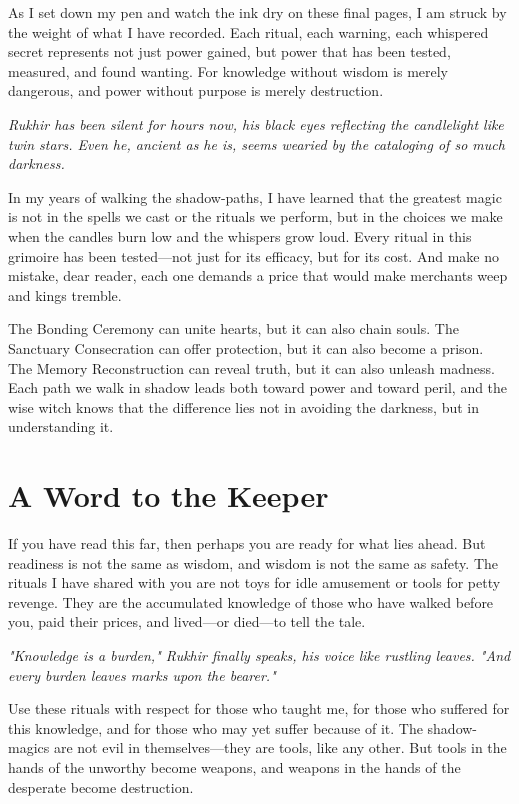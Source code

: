 \documentclass[12pt,twoside]{book}
\newcommand{\shadow}[1]{\textit{#1}}
\begin{document}
\lettrine[lines=3]{A}{}s I set down my pen and watch the ink dry on these final pages, I am struck by the weight of what I have recorded. Each ritual, each warning, each whispered secret represents not just power gained, but power that has been tested, measured, and found wanting. For knowledge without wisdom is merely dangerous, and power without purpose is merely destruction.

\shadow{Rukhir has been silent for hours now, his black eyes reflecting the candlelight like twin stars. Even he, ancient as he is, seems wearied by the cataloging of so much darkness.}

In my years of walking the shadow-paths, I have learned that the greatest magic is not in the spells we cast or the rituals we perform, but in the choices we make when the candles burn low and the whispers grow loud. Every ritual in this grimoire has been tested—not just for its efficacy, but for its cost. And make no mistake, dear reader, each one demands a price that would make merchants weep and kings tremble.

The Bonding Ceremony can unite hearts, but it can also chain souls. The Sanctuary Consecration can offer protection, but it can also become a prison. The Memory Reconstruction can reveal truth, but it can also unleash madness. Each path we walk in shadow leads both toward power and toward peril, and the wise witch knows that the difference lies not in avoiding the darkness, but in understanding it.

\section*{A Word to the Keeper}

If you have read this far, then perhaps you are ready for what lies ahead. But readiness is not the same as wisdom, and wisdom is not the same as safety. The rituals I have shared with you are not toys for idle amusement or tools for petty revenge. They are the accumulated knowledge of those who have walked before you, paid their prices, and lived—or died—to tell the tale.

\shadow{"Knowledge is a burden," Rukhir finally speaks, his voice like rustling leaves. "And every burden leaves marks upon the bearer."}

Use these rituals with respect for those who taught me, for those who suffered for this knowledge, and for those who may yet suffer because of it. The shadow-magics are not evil in themselves—they are tools, like any other. But tools in the hands of the unworthy become weapons, and weapons in the hands of the desperate become destruction.
\end{document}

